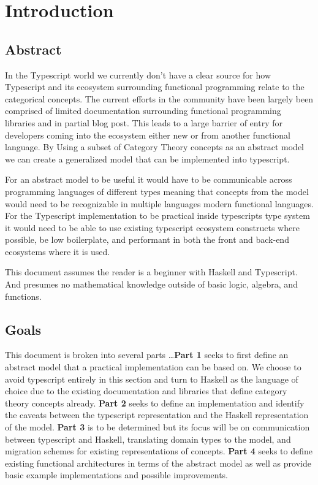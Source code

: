 \section{Introduction}
\subsection{Abstract}
In the Typescript world we currently don't have a clear source  for how Typescript and its ecosystem surrounding functional programming relate to the categorical concepts. The current efforts in the community have been largely been comprised of  limited documentation surrounding functional programming  libraries and in partial blog post. This leads to a large barrier of entry for developers coming into the ecosystem either new or from another functional language. By Using a subset of Category Theory concepts as an abstract model we can create a generalized model that can be implemented into typescript.

For an abstract model to be useful it would have to be communicable across programming languages of different types meaning that concepts from the model would need to be recognizable in multiple languages modern functional languages. For the Typescript implementation to be practical inside typescripts type system it would need to be able to use existing typescript ecosystem constructs where possible, be low boilerplate, and performant in both the front and back-end ecosystems where it is used.

This document assumes the reader is a beginner with Haskell and Typescript. And presumes no mathematical knowledge outside of basic logic, algebra, and functions.

\subsection{Goals}
This document is broken into several parts \ldots \textbf{Part 1} seeks to first define an abstract model that a practical implementation can be based on. We choose to avoid typescript entirely in this section and turn to Haskell as the language of choice due to the existing documentation and libraries that define category theory concepts already. \textbf{Part 2} seeks to define an implementation and identify the caveats between the typescript representation and the Haskell representation of the model. \textbf{Part 3} is to be determined but its focus will be on communication between typescript and Haskell, translating domain types to the model, and migration schemes for existing representations of concepts. \textbf{Part 4} seeks to define existing functional architectures in terms of the abstract model as well as provide basic example implementations and possible improvements.